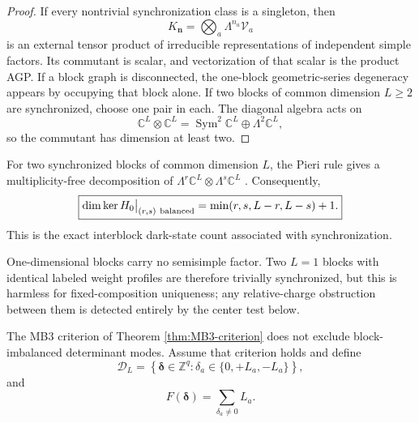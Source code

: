 \documentclass[11pt]{article}
\numberwithin{equation}{section}
\newcommand{\bn}{\mathbf n}
\newcommand{\cV}{\mathcal V}
\begin{document}
\begin{proof}
If every nontrivial synchronization class is a singleton, then
\begin{equation}
 K_{\bn}=\bigotimes_a\Lambda^{n_a}\cV_a
 \label{eq:K-n-irred}
\end{equation}
is an external tensor product of irreducible representations of independent simple factors.  Its commutant is scalar, and vectorization of that scalar is the product AGP.  If a block graph is disconnected, the one-block geometric-series degeneracy appears by occupying that block alone.  If two blocks of common dimension $L\ge2$ are synchronized, choose one pair in each.  The diagonal algebra acts on
\begin{equation}
 \mathbb C^L\otimes\mathbb C^L
 =
 \operatorname{Sym}^2\mathbb C^L
 \oplus
 \Lambda^2\mathbb C^L,
 \label{eq:sync-two-fund}
\end{equation}
so the commutant has dimension at least two.
\end{proof}

For two synchronized blocks of common dimension $L$, the Pieri rule gives a multiplicity-free decomposition of
$\Lambda^r\mathbb C^L\otimes\Lambda^s\mathbb C^L$ \cite{FultonHarris1991}.  Consequently,
\begin{equation}
 \boxed{
 \dim\ker H_0\big|_{(r,s)\ {\rm balanced}}
 =
 \min(r,s,L-r,L-s)+1.}
 \label{eq:synchronized-count}
\end{equation}
This is the exact interblock dark-state count associated with synchronization.

One-dimensional blocks carry no semisimple factor.  Two $L=1$ blocks with identical labeled weight profiles are therefore trivially synchronized, but this is harmless for fixed-composition uniqueness; any relative-charge obstruction between them is detected entirely by the center test below.

The MB3 criterion of Theorem \ref{thm:MB3-criterion} does not exclude block-imbalanced determinant modes.  Assume that criterion holds and define
\begin{equation}
 \mathcal D_L
 =
 \left\{
 \boldsymbol\delta\in\mathbb Z^q:
 \delta_a\in\{0,+L_a,-L_a\}
 \right\},
 \label{eq:det-difference-set}
\end{equation}
and
\begin{equation}
 F(\boldsymbol\delta)
 =
 \sum_{\delta_a\ne0}L_a.
 \label{eq:F-delta}
\end{equation}
\end{document}
